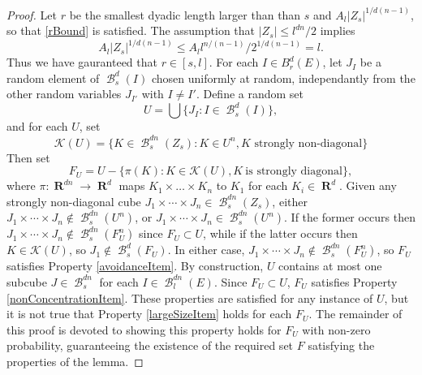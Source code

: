 \documentclass[dvipsnames,letterpaper,12pt]{article}
\numberwithin{equation}{section}
\theoremstyle{plain}
\theoremstyle{remark}
\DeclareMathOperator{\RR}{\mathbf{R}}
\DeclareMathOperator{\B}{\mathcal{B}}
\begin{document}
\begin{proof}
	Let $r$ be the smallest dyadic length larger than than $s$ and $A_l |Z_s|^{1/d(n-1)}$, so that \eqref{rBound} is satisfied. The assumption that $|Z_s| \leq l^{dn}/2$ implies
	\[ A_l |Z_s|^{1/d(n-1)} \leq A_l l^{n/(n-1)} / 2^{1/d(n-1)} = l. \]
	Thus we have gauranteed that $r \in [s,l]$. For each $I \in B_r^d(E)$, let $J_I$ be a random element of $\B^d_s(I)$ chosen uniformly at random, independantly from the other random variables $J_{I'}$ with $I \neq I'$. Define a random set
	\[ 	U = \bigcup \{ J_I : I \in \B^d_s(I) \}, \]
	and for each $U$, set
	\[ \mathcal{K}(U) = \{ K \in \B^{dn}_s(Z_s) : K \in U^n, \text{$K$ strongly non-diagonal} \} \]
	Then set
	\begin{equation} \label{defOfF}
		F_U = U - \{ \pi(K): K \in \mathcal{K}(U), K\ \text{is strongly diagonal} \},
	\end{equation}
	where $\pi: \RR^{dn} \to \RR^d$ maps $K_1 \times \dots \times K_n$ to $K_1$ for each $K_i \in \RR^d$. Given any strongly non-diagonal cube $J_1 \times \cdots \times J_n \in \B_s^{dn}(Z_s)$, either $J_1 \times \cdots \times J_n \not \in \B_s^{dn}(U^n)$, or $J_1 \times \cdots \times J_n \in \B_s^{dn}(U^n)$. If the former occurs then $J_1 \times \cdots \times J_n \not \in \B_s^{dn}(F_U^n)$ since $F_U \subset U$, while if the latter occurs then $K \in \mathcal{K}(U)$, so $J_1 \not \in \B_s^d(F_U)$. In either case, $J_1 \times \cdots \times J_n \not \in \B_s^{dn}(F_U^n)$, so $F_U$ satisfies Property \ref{avoidanceItem}. By construction, $U$ contains at most one subcube $J \in \B^{dn}_s$ for each $I \in \B^{dn}_l(E)$. Since $F_U \subset U$, $F_U$ satisfies Property \ref{nonConcentrationItem}. These properties are satisfied for any instance of $U$, but it is not true that Property \ref{largeSizeItem} holds for each $F_U$. The remainder of this proof is devoted to showing this property holds for $F_U$ with non-zero probability, guaranteeing the existence of the required set $F$ satisfying the properties of the lemma.


\end{proof}
\end{document}
